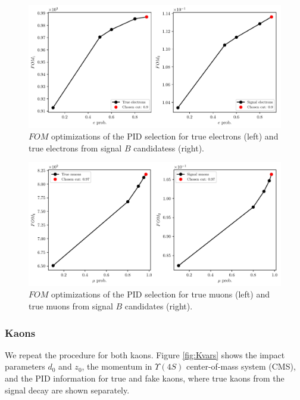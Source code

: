 \begin{figure}[H]
	\centering
	\captionsetup{width=.8\linewidth}
	\includegraphics[width=\linewidth]{fig/FSP_e_fom}
	\caption{$FOM$ optimizations of the PID selection for true electrons (left) and true electrons from signal $B$ candidatess (right).}
	\label{fig:efom}
\end{figure}

\begin{figure}[H]
	\centering
	\captionsetup{width=.8\linewidth}
	\includegraphics[width=\linewidth]{fig/FSP_mu_fom}
	\caption{$FOM$ optimizations of the PID selection for true muons (left) and true muons from signal $B$ candidates (right).}
	\label{fig:mufom}
\end{figure}


\subsubsection{Kaons}

We repeat the procedure for both kaons. Figure \ref{fig:Kvars} shows the impact parameters $d_0$ and $z_0$, the momentum in  $\Upsilon(4S)$ center-of-mass system (CMS), and the PID information for true and fake kaons, where true kaons from the signal decay are shown separately.

